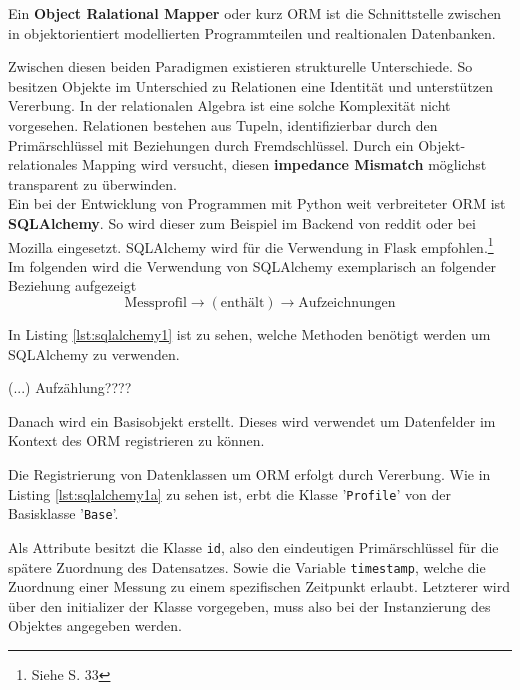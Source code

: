     Ein  \textbf{Object Ralational Mapper} oder kurz ORM ist die Schnittstelle zwischen in objektorientiert modellierten Programmteilen und realtionalen Datenbanken. 
    
    Zwischen diesen beiden Paradigmen existieren strukturelle Unterschiede. So besitzen Objekte im Unterschied zu Relationen eine Identität und unterstützen Vererbung. In der relationalen Algebra ist eine solche Komplexität nicht vorgesehen. Relationen bestehen aus Tupeln, identifizierbar durch den Primärschlüssel mit Beziehungen durch Fremdschlüssel. Durch ein Objekt-relationales Mapping wird versucht, diesen \textbf{impedance Mismatch} möglichst transparent zu überwinden. \\
    
    Ein bei der Entwicklung von Programmen mit Python weit verbreiteter ORM ist \textbf{SQLAlchemy}. So wird dieser zum Beispiel im Backend von reddit oder bei Mozilla eingesetzt. SQLAlchemy wird für die Verwendung in Flask empfohlen.\footnote{Siehe \cite{openingtheflask} S. 33} \\
    
    
    Im folgenden wird die Verwendung von SQLAlchemy exemplarisch an folgender  Beziehung aufgezeigt \[ \mbox{Messprofil} \to (\mbox{enthält}) \to \mbox{Aufzeichnungen}\] 


    In Listing \ref{lst:sqlalchemy1} ist zu sehen, welche Methoden benötigt werden um SQLAlchemy zu verwenden.
    
    (...)  Aufzählung????
    
    Danach wird ein Basisobjekt erstellt. Dieses wird verwendet um Datenfelder im Kontext des ORM registrieren zu können. 
    
   
    Die Registrierung von Datenklassen um ORM erfolgt durch Vererbung. Wie in Listing \ref{lst:sqlalchemy1a} zu sehen ist, erbt die Klasse '\texttt{Profile}' von der Basisklasse '\texttt{Base}'.
    
    Als Attribute besitzt die Klasse \texttt{id}, also den eindeutigen Primärschlüssel für die spätere Zuordnung des Datensatzes. Sowie die Variable \texttt{timestamp}, welche die Zuordnung einer Messung zu einem spezifischen Zeitpunkt erlaubt. Letzterer wird über den initializer der Klasse vorgegeben, muss also bei der Instanzierung des Objektes angegeben werden.
    
